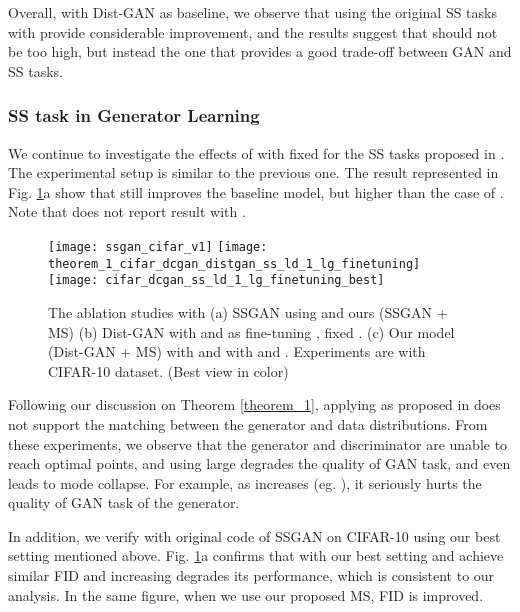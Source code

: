 \documentclass{article}
\begin{document}
Overall, 
with Dist-GAN as baseline, we observe that using the original SS tasks with  provide considerable improvement, and the results suggest that  should not be too high, but instead the one that provides a good trade-off between GAN and SS tasks. 


\subsubsection{SS task in Generator Learning}
\label{ss_task_generator_learning}


We continue to investigate the effects of  with fixed 
for the SS tasks proposed in 
\cite{chen-arxiv-2018}.
The experimental setup is similar to the previous one. The result represented in Fig. \ref{cifar_dcgan_dinetuning_g_d}a show that  still improves the baseline model, but higher than the case of . 
Note that 
\cite{chen-arxiv-2018} does not report result with .




\begin{figure}
  \centering
  \texttt{[image: ssgan\_cifar\_v1]}
  \texttt{[image: theorem\_1\_cifar\_dcgan\_distgan\_ss\_ld\_1\_lg\_finetuning]}
  \texttt{[image: cifar\_dcgan\_ss\_ld\_1\_lg\_finetuning\_best]}
\caption{The ablation studies with (a) SSGAN using  and ours (SSGAN + MS) (b) Dist-GAN with  and  as fine-tuning , fixed . (c) Our model (Dist-GAN + MS) with  and  with  and . Experiments are with CIFAR-10 dataset. (Best view in color)}
  \label{cifar_dcgan_dinetuning_g_d}
\end{figure}



Following our discussion 
on  Theorem \ref{theorem_1}, applying  as proposed 
in 
\cite{chen-arxiv-2018}
does not support the matching between the generator and data distributions. From these experiments, we observe that the generator and discriminator are unable to reach optimal points, and using large  degrades the quality of GAN task, and even leads to mode collapse. For example, as   increases (eg. ), it seriously hurts the quality of GAN task of the generator. 


In addition, we verify with original code of SSGAN \cite{chen-arxiv-2018} on CIFAR-10 using our best setting mentioned above. Fig. \ref{cifar_dcgan_dinetuning_g_d}a confirms that with our best setting  and  achieve similar FID and increasing  degrades its performance, which is consistent to our analysis. In the same figure, when we use our proposed MS,  FID is improved.
\end{document}

